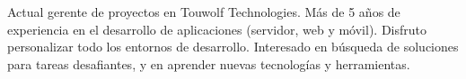 
\begin{cvparagraph}

Actual gerente de proyectos en Touwolf Technologies. Más de 5 años de experiencia en el desarrollo de aplicaciones (servidor, web y móvil). Disfruto personalizar todo los entornos de desarrollo. Interesado en búsqueda de soluciones para tareas desafiantes, y en aprender nuevas tecnologías y herramientas.
\end{cvparagraph}
